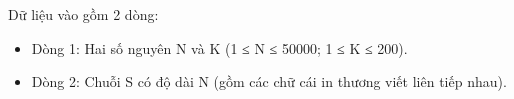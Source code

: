 Dữ liệu vào gồm 2 dòng:  
\begin{itemize}
	\item     Dòng 1: Hai số nguyên N và K (1 ≤ N ≤ 50000; 1 ≤ K ≤ 200).   
	\item     Dòng 2: Chuỗi S có độ dài N (gồm các chữ cái in thương viết liên tiếp nhau).   
\end{itemize}



\